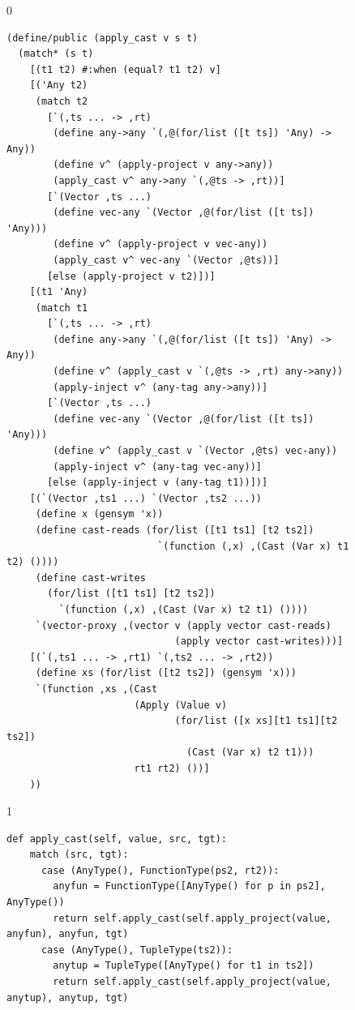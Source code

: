 \documentclass[7x10]{TimesAPriori_MIT}%
\def\racketEd{0}
\def\pythonEd{1}
\providecommand{\BookEdition}{1}
\let\edition\BookEdition
\newcommand{\pythonColor}[0]{}
\numberwithin{theorem}{chapter}
\numberwithin{definition}{chapter}
\numberwithin{equation}{chapter}
\begin{document}
\begin{figure}[tbp]
  \begin{tcolorbox}[colback=white]
{\if\edition\racketEd    
\begin{lstlisting}[basicstyle=\ttfamily\footnotesize]
(define/public (apply_cast v s t)
  (match* (s t)
    [(t1 t2) #:when (equal? t1 t2) v]
    [('Any t2) 
     (match t2
       [`(,ts ... -> ,rt)
        (define any->any `(,@(for/list ([t ts]) 'Any) -> Any))
        (define v^ (apply-project v any->any))
        (apply_cast v^ any->any `(,@ts -> ,rt))]
       [`(Vector ,ts ...)
        (define vec-any `(Vector ,@(for/list ([t ts]) 'Any)))
        (define v^ (apply-project v vec-any))
        (apply_cast v^ vec-any `(Vector ,@ts))]
       [else (apply-project v t2)])]
    [(t1 'Any) 
     (match t1
       [`(,ts ... -> ,rt)
        (define any->any `(,@(for/list ([t ts]) 'Any) -> Any))
        (define v^ (apply_cast v `(,@ts -> ,rt) any->any))
        (apply-inject v^ (any-tag any->any))]
       [`(Vector ,ts ...)
        (define vec-any `(Vector ,@(for/list ([t ts]) 'Any)))
        (define v^ (apply_cast v `(Vector ,@ts) vec-any))
        (apply-inject v^ (any-tag vec-any))]
       [else (apply-inject v (any-tag t1))])]
    [(`(Vector ,ts1 ...) `(Vector ,ts2 ...))
     (define x (gensym 'x))
     (define cast-reads (for/list ([t1 ts1] [t2 ts2])
                          `(function (,x) ,(Cast (Var x) t1 t2) ())))
     (define cast-writes
       (for/list ([t1 ts1] [t2 ts2])
         `(function (,x) ,(Cast (Var x) t2 t1) ())))
     `(vector-proxy ,(vector v (apply vector cast-reads)
                             (apply vector cast-writes)))]
    [(`(,ts1 ... -> ,rt1) `(,ts2 ... -> ,rt2))
     (define xs (for/list ([t2 ts2]) (gensym 'x)))
     `(function ,xs ,(Cast
                      (Apply (Value v)
                             (for/list ([x xs][t1 ts1][t2 ts2])
                               (Cast (Var x) t2 t1)))
                      rt1 rt2) ())]
    ))
\end{lstlisting}
\fi}
{\if\edition\pythonEd\pythonColor
\begin{lstlisting}[basicstyle=\ttfamily\footnotesize]
  def apply_cast(self, value, src, tgt):
    match (src, tgt):
      case (AnyType(), FunctionType(ps2, rt2)):
        anyfun = FunctionType([AnyType() for p in ps2], AnyType())
        return self.apply_cast(self.apply_project(value, anyfun), anyfun, tgt)
      case (AnyType(), TupleType(ts2)):
        anytup = TupleType([AnyType() for t1 in ts2])
        return self.apply_cast(self.apply_project(value, anytup), anytup, tgt)

\end{lstlisting}}
\end{tcolorbox}
\end{figure}
\end{document}
